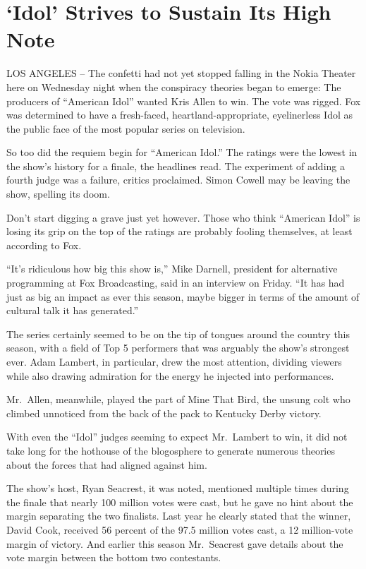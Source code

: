 \documentclass[12pt,a4paper,onecolumn]{article}
\begin{document}
\section{`Idol' Strives to Sustain Its High Note}

LOS ANGELES -- The confetti had not yet stopped falling in the Nokia Theater here on Wednesday night
when the conspiracy theories began to emerge: The producers of ``American Idol'' wanted Kris Allen
to win. The vote was rigged. Fox was determined to have a fresh-faced, heartland-appropriate,
eyelinerless Idol as the public face of the most popular series on television.

So too did the requiem begin for ``American Idol.'' The ratings were the lowest in the show's
history for a finale, the headlines read. The experiment of adding a fourth judge was a failure,
critics proclaimed. Simon Cowell may be leaving the show, spelling its doom.

Don't start digging a grave just yet however. Those who think ``American Idol'' is losing its grip
on the top of the ratings are probably fooling themselves, at least according to Fox.

``It's ridiculous how big this show is,'' Mike Darnell, president for alternative programming at Fox
Broadcasting, said in an interview on Friday. ``It has had just as big an impact as ever this
season, maybe bigger in terms of the amount of cultural talk it has generated.''

The series certainly seemed to be on the tip of tongues around the country this season, with a field
of Top 5 performers that was arguably the show's strongest ever. Adam Lambert, in particular, drew
the most attention, dividing viewers while also drawing admiration for the energy he injected into
performances.

Mr.~Allen, meanwhile, played the part of Mine That Bird, the unsung colt who climbed unnoticed from
the back of the pack to Kentucky Derby victory.

With even the ``Idol'' judges seeming to expect Mr.~Lambert to win, it did not take long for the
hothouse of the blogosphere to generate numerous theories about the forces that had aligned against
him.

The show's host, Ryan Seacrest, it was noted, mentioned multiple times during the finale that nearly
100 million votes were cast, but he gave no hint about the margin separating the two finalists. Last
year he clearly stated that the winner, David Cook, received 56 percent of the 97.5 million votes
cast, a 12 million-vote margin of victory. And earlier this season Mr.~Seacrest gave details about
the vote margin between the bottom two contestants.
\end{document}
